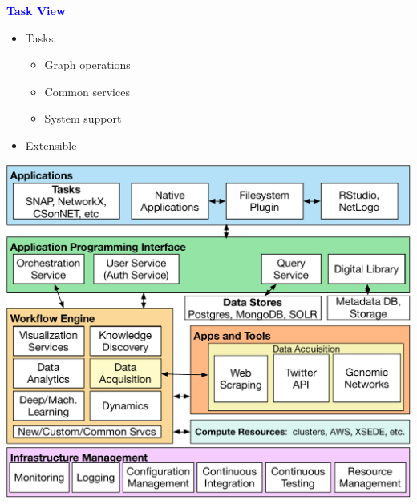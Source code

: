 \documentclass[landscape,paperwidth=70in,paperheight=46in,fontscale=0.225]{baposter} %
\begin{document}
\begin{poster}
{\begin{center}
\textcolor{blue}{\large\textbf{Task View}}
\end{center}
\begin{minipage}{.4\textwidth}
\begin{itemize}[leftmargin=*,noitemsep,topsep=0pt]
\item Tasks:
\begin{itemize}
    \item Graph operations
    \item Common services
    \item System support
\end{itemize}
\item Extensible
\end{itemize}
\end{minipage}
\hfill
\begin{minipage}{.6\textwidth}
\includegraphics[scale=0.25]{figures/CINSArchV8.pdf} 
\end{minipage}

\vspace{4mm}

}
\end{poster}
\end{document}
